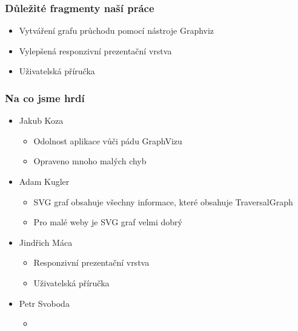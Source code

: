 \documentclass{beamer}
\begin{document}
\begin{frame}[allowframebreaks]\frametitle{Důležité fragmenty naší práce}
  \begin{itemize}
    \item Vytváření grafu průchodu pomocí nástroje Graphviz
		\item Vylepšená responzivní prezentační vrstva
		\item Uživatelská příručka
  \end{itemize}
\end{frame}

\begin{frame}[allowframebreaks]\frametitle{Na co jsme hrdí} 
  \begin{itemize}
    \item Jakub Koza
      \begin{itemize}
       \item Odolnost aplikace vůči pádu GraphVizu
       \item Opraveno mnoho malých chyb
     \end{itemize}
   
    \item Adam Kugler
      \begin{itemize}
       \item SVG graf obsahuje všechny informace, které obsahuje TraversalGraph
       \item Pro malé weby je SVG graf velmi dobrý
     \end{itemize}

    \item Jindřich Máca
      \begin{itemize}
       \item Responzivní prezentační vrstva
			 \item Uživatelská příručka
      \end{itemize}  
   
    \item Petr Svoboda
      \begin{itemize}
			\item
     \end{itemize}
   \end{itemize}  
\end{frame}
\end{document}
